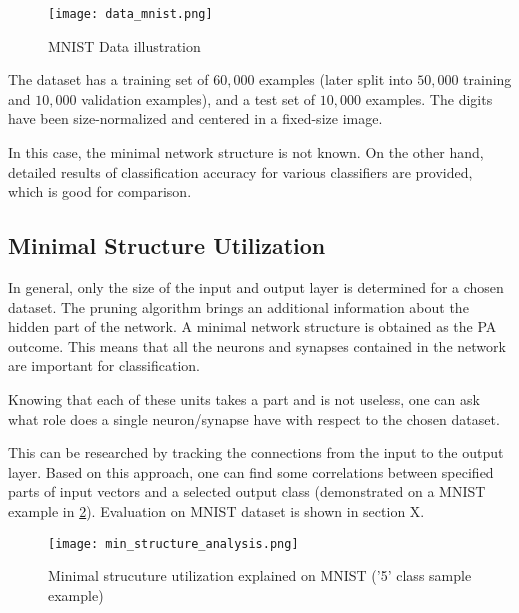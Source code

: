\begin{figure}[H]
  \centering
  \texttt{[image: data\_mnist.png]}
  \caption{MNIST Data illustration \citep{online:mnist}}
  \label{img:data_mnist}
\end{figure}

The dataset has a training set of $ 60,000 $ examples (later split into $ 50,000 $ training and $ 10,000 $ validation examples), and a test set of $ 10,000 $ examples. The digits have been size-normalized and centered in a fixed-size image.

In this case, the minimal network structure is not known. On the other hand, detailed results of classification accuracy for various classifiers are provided, which is good for comparison.

\subsection{Minimal Structure Utilization}
In general, only the size of the input and output layer is determined for a chosen dataset. The pruning algorithm brings an additional information about the hidden part of the network. A minimal network structure is obtained as the PA outcome. This means that all the neurons and synapses contained in the network are important for classification.

Knowing that each of these units takes a part and is not useless, one can ask what role does a single neuron/synapse have with respect to the chosen dataset.

This can be researched by tracking the connections from the input to the output layer. Based on this approach, one can find some correlations between specified parts of input vectors and a selected output class (demonstrated on a MNIST example in \cref{img:structure_util}). Evaluation on MNIST dataset is shown in section X.

\begin{figure}[H]
  \centering
  \texttt{[image: min\_structure\_analysis.png]}
  \caption{Minimal strucuture utilization explained on MNIST ('5' class sample example)}
  \label{img:structure_util}
\end{figure}
